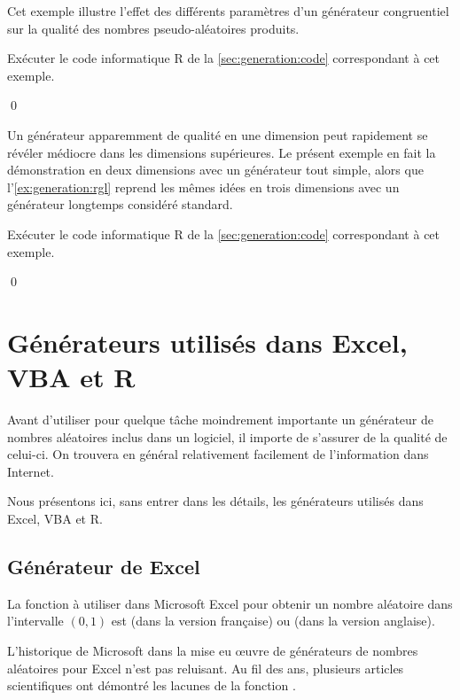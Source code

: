 \begin{exemple}
  \label{exemple:generation:rand}
  Cet exemple illustre l'effet des différents paramètres d'un
  générateur congruentiel sur la qualité des nombres pseudo-aléatoires
  produits.

  \begin{gotoR}
    Exécuter le code informatique R de la
    \autoref{sec:generation:code} correspondant à cet exemple.
  \end{gotoR}
  \qed
\end{exemple}

\begin{exemple}
  Un générateur apparemment de qualité en une dimension peut
  rapidement se révéler médiocre dans les dimensions supérieures. Le
  présent exemple en fait la démonstration en deux dimensions avec un
  générateur tout simple, alors que l'\autoref{ex:generation:rgl}
  reprend les mêmes idées en trois dimensions avec un générateur
  longtemps considéré standard.

  \begin{gotoR}
    Exécuter le code informatique R de la
    \autoref{sec:generation:code} correspondant à cet exemple.
  \end{gotoR}
  \qed
\end{exemple}


\section{Générateurs utilisés dans Excel, VBA et R}

Avant d'utiliser pour quelque tâche moindrement importante un
générateur de nombres aléatoires inclus dans un logiciel, il importe
de s'assurer de la qualité de celui-ci. On trouvera en général
relativement facilement de l'information dans Internet.

Nous présentons ici, sans entrer dans les détails, les générateurs
utilisés dans Excel, VBA et R.

\subsection{Générateur de Excel}

La fonction à utiliser dans Microsoft Excel pour obtenir un nombre
aléatoire dans l'intervalle $(0, 1)$ est  (dans la
version française) ou  (dans la version anglaise).

L'historique de Microsoft dans la mise eu {\oe}uvre de générateurs de
nombres aléatoires pour Excel n'est pas reluisant. Au fil des ans,
plusieurs articles scientifiques ont démontré les lacunes de la
fonction .

